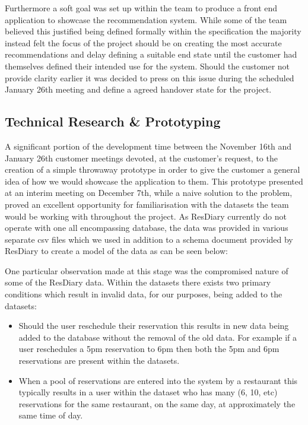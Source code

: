 \documentclass{l3proj}
\begin{document}
Furthermore a soft goal was set up within the team to produce a front end application to showcase the recommendation system. While some of the team believed this justified being defined formally within the specification the majority instead felt the focus of the project should be on creating the most accurate recommendations and delay defining a suitable end state until the customer had themselves defined their intended use for the system. Should the customer not provide clarity earlier it was decided to press on this issue during the scheduled January 26th meeting and define a agreed handover state for the project.


\subsection{Technical Research \& Prototyping}
\label{techresearchproto}


A significant portion of the development time between the November 16th and January 26th customer meetings devoted, at the customer’s request, to the creation of a simple throwaway prototype in order to give the customer a general idea of how we would showcase the application to them. This prototype presented at an interim meeting on December 7th, while a naive solution to the problem, proved an excellent opportunity for familiarisation with the datasets the team would be working with throughout the project. As ResDiary currently do not operate with one all encompassing database, the data was provided in various separate csv files which we used in addition to a schema document provided by ResDiary to create a model of the data as can be seen below:

One particular observation made at this stage was the compromised nature of some of the ResDiary data. Within the datasets there exists two primary conditions which result in invalid data, for our purposes, being added to the datasets:

\begin{itemize}
\item Should the user reschedule their reservation this results in new data being added to the database without the removal of the old data. For example if a user reschedules a 5pm reservation to 6pm then both the 5pm and 6pm reservations are present within the datasets.
\item When a pool of reservations are entered into the system by a restaurant this typically results in a user within the dataset who has many (6, 10, etc) reservations for the same restaurant, on the same day, at approximately the same time of day.
\end{itemize}
\end{document}
